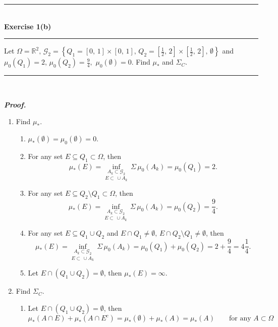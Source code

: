 \documentclass[a4paper,11pt]{article}
\begin{document}

\begin{flushleft}
	\rule[-0.5ex]{17cm}{2pt}\\
		\textbf{Exercise 1(b)}\\
	\rule[1.5ex]{17cm}{0.5pt}
		Let $\Omega = \mathbb{R}^2,\,\mathcal{G}_2 = \left\{Q_1 = [0,\,1] \times [0,\,1],\,Q_2 = \left[\frac{1}{2},\,2\right] \times \left[\frac{1}{2},\,2\right],\,\emptyset\right\}$ and $\mu_0(Q_1) = 2,\,\mu_0(Q_2) = \frac{9}{4},$ $\mu_0(\emptyset) = 0$. Find $\mu_*$ and $\Sigma_C$.
	\rule[1.0ex]{17cm}{0.5pt}\
\end{flushleft}

\textbf{\textit{Proof.}}

\begin{enumerate}
	\item Find $\mu_*$.
	\begin{enumerate}
		\item $\mu_*(\emptyset) = \mu_0(\emptyset) = 0$.\\

		\item For any set $E \subseteq Q_1 \subset \Omega$, then
			$$\mu_*(E)
			= \underset{E \subset\,\cup A_k}{\underset{A_k \subset \mathcal{G}_2}{\inf}}\,\Sigma\,\mu_0(A_k)
			= \mu_0(Q_1)
			= 2.$$

		\item For any set $E \subseteq Q_2 \setminus Q_1 \subset \Omega$, then
			$$\mu_*(E)
			= \underset{E \subset\,\cup A_k}{\underset{A_k \subset \mathcal{G}_2}{\inf}}\,\Sigma\,\mu_0(A_k)
			= \mu_0(Q_2)
			= \frac{9}{4}.$$

		\item For any set $E \subseteq Q_1 \cup Q_2$ and $E \cap Q_1 \neq \emptyset,\,E \cap Q_2 \setminus Q_1 \neq \emptyset$, then
			$$\mu_*(E)
			= \underset{E \subset\,\cup A_k}{\underset{A_k \subset \mathcal{G}_2}{\inf}}\,\Sigma\,\mu_0(A_k)
			= \mu_0(Q_1) + \mu_0(Q_2)
			= 2 + \frac{9}{4}
			= 4\frac{1}{4}.$$

		\item Let $E \cap (Q_1 \cup Q_2) = \emptyset$, then $\mu_*(E) = \infty$.\\
	\end{enumerate}

\newpage

	\item Find $\Sigma_C$.
	\begin{enumerate}
		\item Let $E \cap (Q_1 \cup Q_2) = \emptyset$, then
			$$\mu_*(A \cap E) + \mu_*(A \cap E^c)
			= \mu_*(\emptyset) + \mu_*(A)
			= \mu_*(A)
			\quad \quad \text{for any }A \subset \Omega$$


\end{enumerate}
\end{enumerate}
\end{document}
